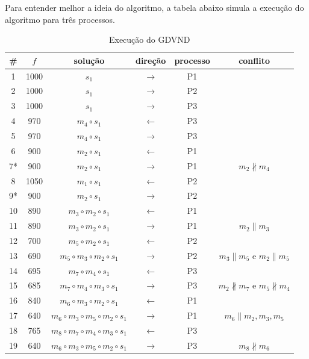 Para entender melhor a ideia do algoritmo, a tabela abaixo simula a execução do algoritmo para três processos.

\begin{table}[htpb]
\centering
\caption{Execução do GDVND}
\begin{tabular}{|c|cccc|c|}
\hline
    \# & $f$ & solução & direção & processo & conflito\\\hline
    1  & 1000 & $s_1$ & $\rightarrow$ & P1 &\\
    2  & 1000 & $s_1$ & $\rightarrow$ & P2 &\\
    3  & 1000 & $s_1$ & $\rightarrow$ & P3 &\\\hline
    4  & 970 & $m_4 \circ s_1$ & $\leftarrow$ & P3 &\\
    5  & 970 & $m_4 \circ s_1$ & $\rightarrow$ & P3 &\\\hline
    6  & 900 & $m_2 \circ s_1$ & $\leftarrow$ & P1 & \\
    7*  & 900 & $m_2 \circ s_1$ & $\rightarrow$ & P1 & $m_2 \nparallel m_4$\\\hline
    8  & 1050 & $m_1 \circ s_1$ & $\leftarrow$ & P2 &\\
    9*  & 900 & $m_2 \circ s_1$ & $\rightarrow$ & P2 &\\\hline
    10 & 890 & $m_3 \circ m_2 \circ s_1$ & $\leftarrow$ & P1 & \\
    11 & 890 & $m_3 \circ m_2 \circ s_1$ & $\rightarrow$ & P1 & $m_2 \parallel m_3$\\\hline
    12 & 700 & $m_5 \circ m_2 \circ s_1$ & $\leftarrow$ & P2 &\\
    13 & 690 & $m_5 \circ m_3 \circ m_2 \circ s_1$ & $\rightarrow$ & P2 & $m_3 \parallel m_5$ e $m_2 \parallel m_5$\\\hline
    14 & 695 & $m_7 \circ m_4 \circ s_1$ & $\leftarrow$ & P3 &\\
    15 & 685 & $m_7 \circ m_4 \circ m_3 \circ s_1$ & $\rightarrow$ & P3 & $m_2 \nparallel m_7$ e $m_5 \nparallel m_4$\\\hline
    16 & 840 & $m_6 \circ m_3 \circ m_2 \circ s_1$ & $\leftarrow$ & P1 &\\
    17 & 640 & $m_6 \circ m_3 \circ m_5 \circ m_2 \circ s_1$ & $\rightarrow$ & P1 & $m_6 \parallel m_2, m_3, m_5$\\\hline
    18 & 765 & $m_8 \circ m_7 \circ m_4 \circ m_3 \circ s_1$ & $\leftarrow$ & P3 &\\
    19 & 640 & $m_6 \circ m_3 \circ m_5 \circ m_2 \circ s_1$ & $\rightarrow$ & P3 & $m_8 \nparallel m_6$\\\hline
\end{tabular}
\end{table}

